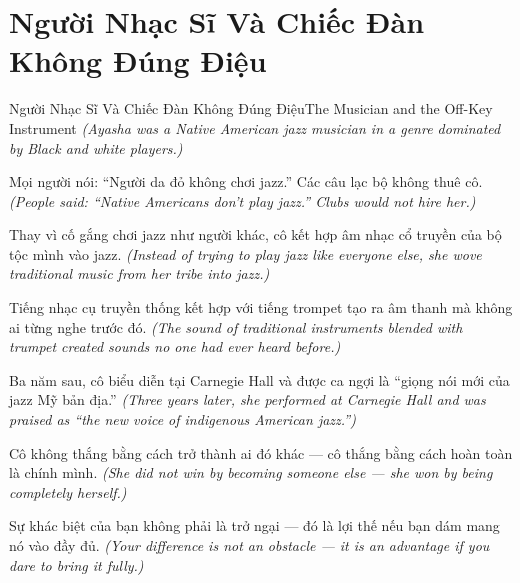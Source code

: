 \section{Người Nhạc Sĩ Và Chiếc Đàn Không Đúng Điệu}
\begin{truyen}{Người Nhạc Sĩ Và Chiếc Đàn Không Đúng Điệu}{The Musician and the Off-Key Instrument}
\textit{(Ayasha was a Native American jazz musician in a genre dominated by Black and white players.)}

Mọi người nói: ``Người da đỏ không chơi jazz.'' Các câu lạc bộ không thuê cô.
\textit{(People said: ``Native Americans don't play jazz.'' Clubs would not hire her.)}

Thay vì cố gắng chơi jazz như người khác, cô kết hợp âm nhạc cổ truyền của bộ tộc mình vào jazz.
\textit{(Instead of trying to play jazz like everyone else, she wove traditional music from her tribe into jazz.)}

Tiếng nhạc cụ truyền thống kết hợp với tiếng trompet tạo ra âm thanh mà không ai từng nghe trước đó.
\textit{(The sound of traditional instruments blended with trumpet created sounds no one had ever heard before.)}

Ba năm sau, cô biểu diễn tại Carnegie Hall và được ca ngợi là ``giọng nói mới của jazz Mỹ bản địa.''
\textit{(Three years later, she performed at Carnegie Hall and was praised as ``the new voice of indigenous American jazz.'')}

Cô không thắng bằng cách trở thành ai đó khác — cô thắng bằng cách hoàn toàn là chính mình.
\textit{(She did not win by becoming someone else — she won by being completely herself.)}

\end{truyen}

\begin{baihoc}
Sự khác biệt của bạn không phải là trở ngại — đó là lợi thế nếu bạn dám mang nó vào đầy đủ.
\textit{(Your difference is not an obstacle — it is an advantage if you dare to bring it fully.)}
\end{baihoc}
\ngancach

